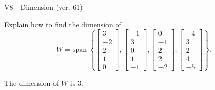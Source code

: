 \begin{exercise}
  \begin{exerciseTitle}V8 - Dimension (ver. 61)\end{exerciseTitle}
  \begin{exerciseStatement}
    Explain how to find the dimension of 
\[W=\mathrm{span}\ \left\{\left[\begin{array}{r}
3 \\
-2 \\
2 \\
1 \\
0
\end{array}\right] , \left[\begin{array}{r}
-1 \\
3 \\
0 \\
1 \\
-1
\end{array}\right] , \left[\begin{array}{r}
0 \\
-1 \\
2 \\
2 \\
-2
\end{array}\right] , \left[\begin{array}{r}
-4 \\
3 \\
2 \\
4 \\
-5
\end{array}\right]\right\}.\]



  \end{exerciseStatement}
  \begin{exerciseAnswer}
   The dimension of \(W\) is  \(3\).
  


  \end{exerciseAnswer}
\end{exercise}
